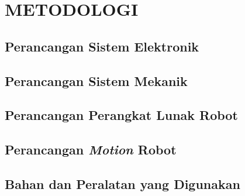 \chapter{METODOLOGI}
\label{chap:desainimplementasi}


\section{Perancangan Sistem Elektronik}
\label{sec:sistemelektronik}


\section{Perancangan Sistem Mekanik}
\label{sec:perancangan_mekanik}


\section{Perancangan Perangkat Lunak Robot}
\label{sec:perancangan_firmware_stm32}


\section{Perancangan \emph{Motion} Robot}
\label{sec:perancangan_software_robot}


\section{Bahan dan Peralatan yang Digunakan}
\label{sec:bahan_dan_peralatan_yang_digunakan}

